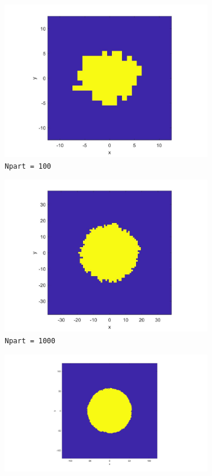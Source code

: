 \documentclass[letterpaper]{article}
\numberwithin{equation}{section} %
\numberwithin{figure}{section} %
\numberwithin{table}{section} %
\begin{document}
\begin{figure}[htbp]
	\centering
	\begin{subfigure}[b]{0.3\textwidth}
		\includegraphics[width=\textwidth]{4direct_Npart100_3suW11T}
		\caption{\texttt{Npart = 100}}
		\label{4direct_Npart100_3suW11T}
	\end{subfigure}
	\begin{subfigure}[b]{0.3\textwidth}
		\includegraphics[width=\textwidth]{4direct_Npart1000_3suW11T}
		\caption{\texttt{Npart = 1000}}
		\label{4direct_Npart1000_3suW11T}
	\end{subfigure}
	\begin{subfigure}[b]{0.3\textwidth}
		\includegraphics[width=\textwidth]{4direct_Npart10000_3suW11T}

\end{subfigure}
\end{figure}
\end{document}
